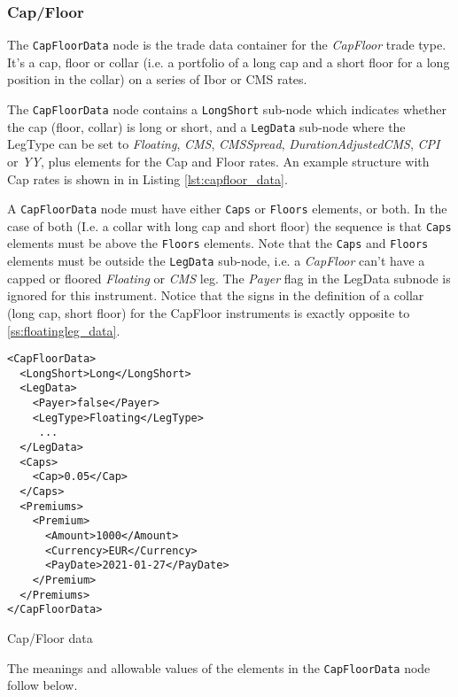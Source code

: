 \subsubsection{Cap/Floor}
\label{ss:capfloor}

The \lstinline!CapFloorData! node is the trade data container for the \emph{CapFloor} trade type.  It's a cap, floor or collar
(i.e. a portfolio of a long cap and a short floor for a long position in the collar) on a series of Ibor or CMS rates. 

The \lstinline!CapFloorData! node contains a \lstinline!LongShort! sub-node which indicates whether the cap (floor, collar)
is long or short, and a \lstinline!LegData!  sub-node where the
LegType can be set to \emph{Floating}, \emph{CMS}, \emph{CMSSpread}, \emph{DurationAdjustedCMS}, \emph{CPI}
or \emph{YY}, plus elements for the Cap and Floor rates. An example structure with Cap rates is shown in in Listing
\ref{lst:capfloor_data}. 

A \lstinline!CapFloorData! node must have either \lstinline!Caps! or \lstinline!Floors!
elements, or both. In the case of both (I.e. a collar with long cap and short floor) the sequence is that  \lstinline!Caps! elements must be above the \lstinline!Floors! elements. Note that 
the \lstinline!Caps! and \lstinline!Floors! elements must be outside the \lstinline!LegData! sub-node, i.e. a \emph{CapFloor} 
can't have a capped or floored  \emph{Floating}  or \emph{CMS} leg.
The \emph{Payer} flag in the LegData subnode is ignored for this instrument. Notice that the signs in the definition of a collar (long cap, short floor) for the CapFloor
instruments is exactly opposite to \ref{ss:floatingleg_data}.

\begin{listing}[H]
\begin{verbatim}
<CapFloorData>
  <LongShort>Long</LongShort>
  <LegData>
    <Payer>false</Payer>
    <LegType>Floating</LegType>
     ...
  </LegData>
  <Caps>
    <Cap>0.05</Cap>
  </Caps>
  <Premiums>
    <Premium>
      <Amount>1000</Amount>
      <Currency>EUR</Currency>
      <PayDate>2021-01-27</PayDate>
    </Premium>
  </Premiums>
</CapFloorData>
\end{verbatim}
\caption{Cap/Floor data}
\label{lst:capfloor_data}
\end{listing}

The meanings and allowable values of the elements in the \lstinline!CapFloorData!  node follow below.

